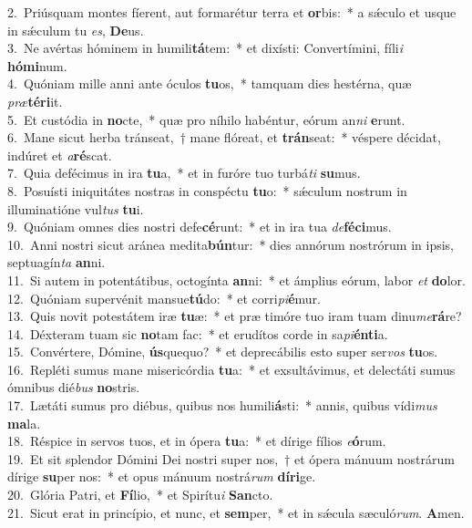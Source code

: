{2.~}Priúsquam montes fíerent, aut formarétur terra et \textbf{or}bis:~* a sǽculo et usque in sǽculum tu \textit{es}, \textbf{De}us.\\
{3.~}Ne avértas hóminem in humili\textbf{tá}tem:~* et dixísti: Convertímini, fíli\textit{i} \textbf{hó}\textbf{mi}num.\\
{4.~}Quóniam mille anni ante óculos \textbf{tu}os,~* tamquam dies hestérna, quæ \textit{præ}\textbf{té}\textbf{ri}it.\\
{5.~}Et custódia in \textbf{no}cte,~* quæ pro níhilo habéntur, eórum an\textit{ni} \textbf{e}runt.\\
{6.~}Mane sicut herba tránseat,~† mane flóreat, et \textbf{trán}seat:~* véspere décidat, indúret et \textit{a}\textbf{ré}scat.\\
{7.~}Quia defécimus in ira \textbf{tu}a,~* et in furóre tuo turbá\textit{ti} \textbf{su}mus.\\
{8.~}Posuísti iniquitátes nostras in conspéctu \textbf{tu}o:~* sǽculum nostrum in illuminatióne vul\textit{tus} \textbf{tu}i.\\
{9.~}Quóniam omnes dies nostri defe\textbf{cé}runt:~* et in ira tua \textit{de}\textbf{fé}\textbf{ci}mus.\\
{10.~}Anni nostri sicut aránea medita\textbf{bún}tur:~* dies annórum nostrórum in ipsis, septuagín\textit{ta} \textbf{an}ni.\\
{11.~}Si autem in potentátibus, octogínta \textbf{an}ni:~* et ámplius eórum, labor \textit{et} \textbf{do}lor.\\
{12.~}Quóniam supervénit mansue\textbf{tú}do:~* et corri\textit{pi}\textbf{é}mur.\\
{13.~}Quis novit potestátem iræ \textbf{tu}æ:~* et præ timóre tuo iram tuam dinu\textit{me}\textbf{rá}re?\\
{14.~}Déxteram tuam sic \textbf{no}tam fac:~* et erudítos corde in sa\textit{pi}\textbf{én}\textbf{ti}a.\\
{15.~}Convértere, Dómine, \textbf{ús}quequo?~* et deprecábilis esto super ser\textit{vos} \textbf{tu}os.\\
{16.~}Repléti sumus mane misericórdia \textbf{tu}a:~* et exsultávimus, et delectáti sumus ómnibus dié\textit{bus} \textbf{no}stris.\\
{17.~}Lætáti sumus pro diébus, quibus nos humili\textbf{á}sti:~* annis, quibus vídi\textit{mus} \textbf{ma}la.\\
{18.~}Réspice in servos tuos, et in ópera \textbf{tu}a:~* et dírige fílios \textit{e}\textbf{ó}rum.\\
{19.~}Et sit splendor Dómini Dei nostri super nos,~† et ópera mánuum nostrárum dírige \textbf{su}per nos:~* et opus mánuum nostrá\textit{rum} \textbf{dí}\textbf{ri}ge.\\
{20.~}Glória Patri, et \textbf{Fí}lio,~* et Spirítu\textit{i} \textbf{San}cto.\\
{21.~}Sicut erat in princípio, et nunc, et \textbf{sem}per,~* et in sǽcula sæculó\textit{rum}. \textbf{A}men.\\
